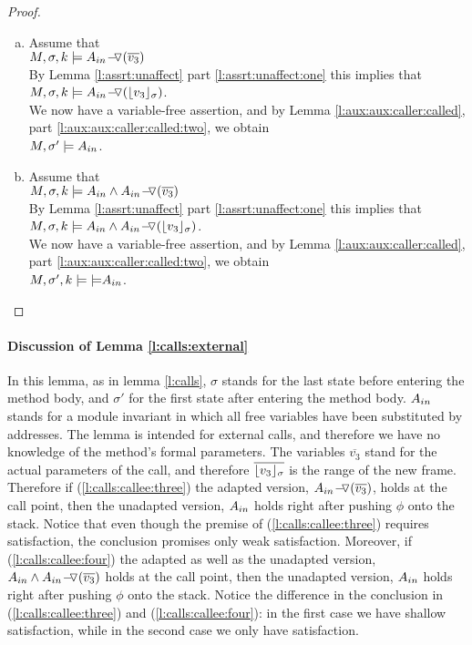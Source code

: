 \begin{proof}
\begin{enumerate}[a.]
\item
Assume that \\
$ M,\sigma ,{k} \models {\ensuremath{ A_{in} \!-\!\!\!\,\!{\triangledown} (\overline {v_3})} } $\\
	By Lemma \ref{l:assrt:unaffect} part \ref{l:assrt:unaffect:one} this  implies that \\
$ M,\sigma ,{k} \models {\ensuremath{ A_{in} \!-\!\!\!\,\!{\triangledown} (\lfloor v_3 \rfloor_{\sigma})} } $.\\
We now have a variable-free assertion, and by Lemma \ref{l:aux:aux:caller:called}, part \ref{l:aux:aux:caller:called:two}, we obtain\\
$ M,  \sigma'    \models A_{in}$.
\item
Assume that \\
$ M,\sigma ,{k} \models {A_{in}\wedge \ensuremath{ A_{in} \!-\!\!\!\,\!{\triangledown} (\overline {v_3})} } $\\
	By Lemma \ref{l:assrt:unaffect} part \ref{l:assrt:unaffect:one} this  implies that \\
$ M,\sigma ,{k} \models {A_{in}\wedge \ensuremath{ A_{in} \!-\!\!\!\,\!{\triangledown} (\lfloor v_3 \rfloor_{\sigma})} } $.\\
We now have a variable-free assertion, and by Lemma \ref{l:aux:aux:caller:called}, part \ref{l:aux:aux:caller:called:two}, we obtain\\
$ M,\sigma' ,{k} \models {\models}  A_{in}$.
\end{enumerate}

\end{proof}

\paragraph{Discussion of Lemma \ref{l:calls:external}} In this lemma,  as in  lemma \ref{l:calls}, 
  $\sigma$ stands for the last state before entering the method body, and $\sigma'$ for the first state after entering the method body.
$A_{in}$ stands for a module invariant in which all free variables have been substituted by addresses.
The lemma is intended for external calls, and therefore we have no knowledge of the method's formal parameters.
The variables   $\overline {v_3}$ stand for the actual parameters of the call, and therefore 
 $\overline {\lfloor v_3 \rfloor_{\sigma}}$ is the range of the new frame.
Therefore if (\ref{l:calls:callee:three})   the adapted version,
 ${ A_{in} \!-\!\!\!\,\!{\triangledown} (\overline {v_3}) }$, holds  at the call point,
 then the unadapted version, $A_{in}$  holds right after pushing $\phi$ onto the stack.
 Notice that  even though the premise of (\ref{l:calls:callee:three}) requires \scoped satisfaction, the conclusion promises
 only weak satisfaction.
 Moreover, if (\ref{l:calls:callee:four})   the adapted as well as the unadapted version,
 $A_{in} \wedge {\ensuremath{ A_{in} \!-\!\!\!\,\!{\triangledown} (\overline {v_3})} }$
 holds  at the call point,
 then the unadapted version, $A_{in}$  holds right after pushing $\phi$ onto the stack.
Notice the difference in the conclusion in (\ref{l:calls:callee:three}) and (\ref{l:calls:callee:four}): in the first case we have  shallow satisfaction, while in the second case we only have \scoped satisfaction.


